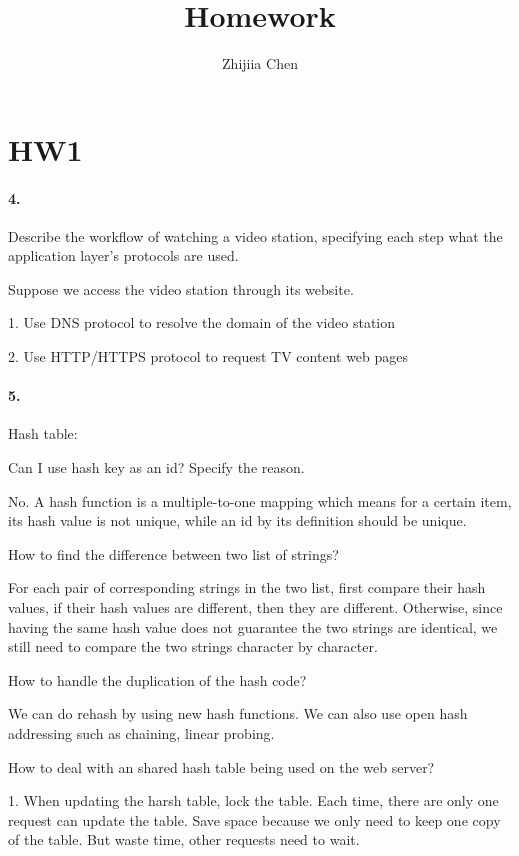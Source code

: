 \documentclass{article}
\title{Homework}
\author{Zhijiia Chen}
\begin{document}
\maketitle
\section{HW1}

\paragraph{4.} Describe the workflow of watching a video station, specifying each step what the application layer’s protocols are used.

Suppose we access the video station through its website.

1. Use DNS protocol to resolve the domain of the video station

2. Use HTTP/HTTPS protocol to request TV content web pages

\noindent \paragraph{5.} Hash table:

Can I use hash key as an id? Specify the reason.

No. A hash function is a multiple-to-one mapping which means for a certain item, its hash value is not unique, while an id by its definition should be unique.

How to find the difference between two list of strings?

For each pair of corresponding strings in the two list, first compare their hash values, if their hash values are different, then they are different. Otherwise, since having the same hash value does not guarantee the two strings are identical, we still need to compare the two strings character by character.

How to handle the duplication of the hash code?

We can do rehash by using new hash functions. We can also use open hash addressing such as chaining, linear probing.

How to deal with an shared hash table being used on the web server?

1. When updating the harsh table, lock the table. Each time, there are only one request can update the table. Save space because we only need to keep one copy of the table. But waste time, other requests need to wait.
\end{document}
